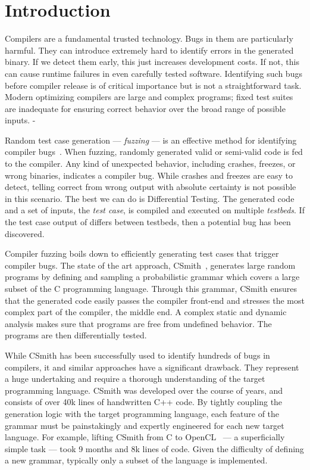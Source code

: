 \section{Introduction}\label{sec:intro}


\noindent
Compilers are a fundamental trusted technology. Bugs in them are particularly harmful. They can introduce extremely hard to identify errors in the generated binary. If we detect them early, this just increases development costs. If not, this can cause runtime failures in even carefully tested software. Identifying such bugs before compiler release is of critical importance but is not a straightforward task. Modern optimizing compilers are large and complex programs; fixed test suites are inadequate for ensuring correct behavior over the broad range of possible inputs. -

Random test case generation --- \emph{fuzzing} --- is an effective method for identifying compiler bugs~\cite{Chen2014a,Kossatchev2005,Chen2013}. When fuzzing, randomly generated valid or semi-valid code is fed to the compiler. Any kind of unexpected behavior, including crashes, freezes, or wrong binaries, indicates a compiler bug. While crashes and freezes are easy to detect, telling correct from wrong output with absolute certainty is not possible in this scenario. The best we can do is Differential Testing. The generated code and a set of inputs, the \emph{test case}, is compiled and executed on multiple \emph{testbeds}. If the test case output of differs between testbeds, then a potential bug has been discovered.

Compiler fuzzing boils down to efficiently generating test cases that trigger compiler bugs. The state of the art approach, CSmith~\cite{Yang2011}, generates large random programs by defining and sampling a probabilistic grammar which covers a large subset of the C programming language. Through this grammar, CSmith ensures that the generated code easily passes the compiler front-end and stresses the most complex part of the compiler, the middle end. A complex static and dynamic analysis makes sure that programs are free from undefined behavior. The programs are then differentially tested.

While CSmith has been successfully used to identify hundreds of bugs in compilers, it and similar approaches have a significant drawback. They represent a huge undertaking and require a thorough understanding of the target programming language. CSmith was developed over the course of years, and consists of over 40k lines of handwritten C++ code. By tightly coupling the generation logic with the target programming language, each feature of the grammar must be painstakingly and expertly engineered for each new target language. For example, lifting CSmith from C to OpenCL~\cite{Lidbury2015a} --- a superficially simple task --- took 9 months and 8k lines of code. Given the difficulty of defining a new grammar, typically only a subset of the language is implemented.


